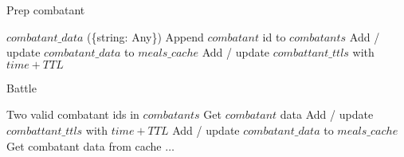 \begin{algorithm}
\caption{Prep combatant}
    \begin{algorithmic}
        \REQUIRE $combatant\_data$ (\{string: Any\})
        \STATE Append $combatant$ id to $combatants$
        \STATE Add / update $combatant\_data$ to $meals\_cache$
        \STATE Add / update $combattant\_ttls$ with $time + TTL$
    \end{algorithmic}
\end{algorithm}

\begin{algorithm}
    \caption{Battle}
    \begin{algorithmic}
        \ENSURE Two valid combatant ids in $combatants$
                \STATE Get $combatant$ data
                \STATE Add / update $combattant\_ttls$ with $time + TTL$
                \STATE Add / update $combatant\_data$ to $meals\_cache$
            \ENDIF
        \ENDFOR
        \STATE Get combatant data from cache
        \STATE $\ldots$
    \end{algorithmic}
\end{algorithm}